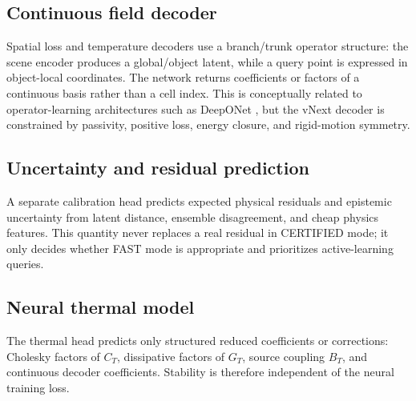 \subsection{Continuous field decoder}

Spatial loss and temperature decoders use a branch/trunk operator structure:
the scene encoder produces a global/object latent, while a query point is
expressed in object-local coordinates. The network returns coefficients or
factors of a continuous basis rather than a cell index. This is conceptually
related to operator-learning architectures such as DeepONet
\cite{lu2021deeponet}, but the vNext decoder is constrained by passivity,
positive loss, energy closure, and rigid-motion symmetry.

\subsection{Uncertainty and residual prediction}

A separate calibration head predicts expected physical residuals and epistemic
uncertainty from latent distance, ensemble disagreement, and cheap physics
features. This quantity never replaces a real residual in CERTIFIED mode; it
only decides whether FAST mode is appropriate and prioritizes active-learning
queries.

\subsection{Neural thermal model}

The thermal head predicts only structured reduced coefficients or corrections:
Cholesky factors of $C_T$, dissipative factors of $G_T$, source coupling
$B_T$, and continuous decoder coefficients. Stability is therefore independent
of the neural training loss.

